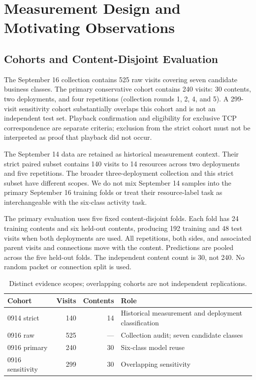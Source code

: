 \section{Measurement Design and Motivating Observations}
\subsection{Cohorts and Content-Disjoint Evaluation}
The September 16 collection contains 525 raw visits covering seven candidate business classes. The primary conservative cohort contains 240 visits: 30 contents, two deployments, and four repetitions (collection rounds 1, 2, 4, and 5). A 299-visit sensitivity cohort substantially overlaps this cohort and is not an independent test set. Playback confirmation and eligibility for exclusive TCP correspondence are separate criteria; exclusion from the strict cohort must not be interpreted as proof that playback did not occur.

The September 14 data are retained as historical measurement context. Their strict paired subset contains 140 visits to 14 resources across two deployments and five repetitions. The broader three-deployment collection and this strict subset have different scopes. We do not mix September 14 samples into the primary September 16 training folds or treat their resource-label task as interchangeable with the six-class activity task.

The primary evaluation uses five fixed content-disjoint folds. Each fold has 24 training contents and six held-out contents, producing 192 training and 48 test visits when both deployments are used. All repetitions, both sides, and associated parent visits and connections move with the content. Predictions are pooled across the five held-out folds. The independent content count is 30, not 240. No random packet or connection split is used.

\begin{table}[t]\centering
\caption{Distinct evidence scopes; overlapping cohorts are not independent replications.}\label{tab:cohorts}
\small\begin{tabular}{lrr>{\raggedright\arraybackslash}p{2.7cm}}\toprule
Cohort & Visits & Contents & Role\\\midrule
0914 strict & 140 & 14 & Historical measurement and deployment classification\\
0916 raw & 525 & --- & Collection audit; seven candidate classes\\
0916 primary & 240 & 30 & Six-class model reuse\\
0916 sensitivity & 299 & 30 & Overlapping sensitivity\\\bottomrule
\end{tabular}\end{table}


